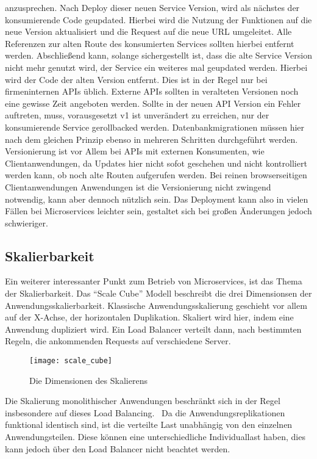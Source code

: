 \noindent anzusprechen. Nach Deploy dieser neuen Service Version, wird als nächstes der konsumierende Code geupdated. Hierbei wird die Nutzung der Funktionen auf die neue Version aktualisiert und die Request auf die neue URL umgeleitet. Alle Referenzen zur alten Route des konsumierten Services sollten hierbei entfernt werden. Abschließend kann, solange sichergestellt ist, dass die alte Service Version nicht mehr genutzt wird, der Service ein weiteres mal geupdated werden. Hierbei wird der Code der alten Version entfernt. Dies ist in der Regel nur bei firmeninternen APIs üblich. Externe APIs sollten in veralteten Versionen noch eine gewisse Zeit angeboten werden. Sollte in der neuen API Version ein Fehler auftreten, muss, vorausgesetzt v1 ist unverändert zu erreichen, nur der konsumierende Service gerollbacked werden.
Datenbankmigrationen müssen hier nach dem gleichen Prinzip ebenso in mehreren Schritten durchgeführt werden.
Versionierung ist vor Allem bei APIs mit externen Konsumenten, wie Clientanwendungen, da Updates hier nicht sofot geschehen und nicht kontrolliert werden kann, ob noch alte Routen aufgerufen werden. Bei reinen browserseitigen Clientanwendungen Anwendungen ist die Versionierung nicht zwingend notwendig, kann aber dennoch nützlich sein.
Das Deployment kann also in vielen Fällen bei Microservices leichter sein, gestaltet sich bei großen Änderungen jedoch schwieriger.

\subsection{Skalierbarkeit}
Ein weiterer interessanter Punkt zum Betrieb von Microservices, ist das Thema der Skalierbarkeit.
Das ``Scale Cube''\cite[][]{abbott2009art} Modell beschreibt die drei Dimensionsen der Anwendungsskalierbarkeit. Klassische Anwendungsskalierung geschieht vor allem auf der X-Achse, der horizontalen Duplikation\cite[][]{abbott2009art}. Skaliert wird hier, indem eine Anwendung dupliziert wird. Ein Load Balancer verteilt dann, nach bestimmten Regeln, die ankommenden Requests auf verschiedene Server.~\cite[vgl.][]{loadbalancing} 

\begin{figure}[!ht]
    \caption{Die Dimensionen des Skalierens \cite{abbott2009art}}
    \label{fig:scalecube}
    \texttt{[image: scale\_cube]}
\end{figure}

Die Skalierung monolithischer Anwendungen beschränkt sich in der Regel insbesondere auf dieses Load Balancing.~\cite[vgl.][]{infaktuell} 
Da die Anwendungsreplikationen funktional identisch sind, ist die verteilte Last unabhängig von den einzelnen Anwendungsteilen. Diese können eine unterschiedliche Individuallast haben, dies kann jedoch über den Load Balancer nicht beachtet werden.

